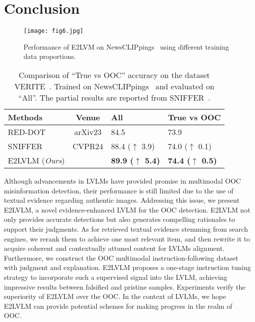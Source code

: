 \section{Conclusion}
\label{sec:Conclusion}

\begin{figure}[t]
  \centering
   \texttt{[image: fig6.jpg]}
   \caption{Performance of E2LVM on NewsCLIPpings~\cite{luo2021newsclippings} using different training data proportions.}
   \label{fig:6}
\end{figure}

\begin{table}[t]
\caption{Comparison of ``True vs OOC'' accuracy on the dataset VERITE~\cite{papadopoulos2024verite}. Trained on NewsCLIPpings~\cite{luo2021newsclippings} and evaluated on ``All''. The partial results are reported from SNIFFER~\cite{qi2024sniffer}.}
\centering
    \begin{adjustbox}{valign=c,max width=\columnwidth}
        \begin{tabular}{l|c|ll}
            \toprule
            Methods & Venue & \textbf{All} & \textbf{True vs OOC} \\
            \hline
            RED-DOT~\cite{papadopoulos2023red} & arXiv23 & 84.5 & 73.9 \\
            SNIFFER~\cite{qi2024sniffer} & CVPR24 & 88.4 ($\uparrow$ 3.9) & 74.0 ($\uparrow$ 0.1)  \\
            \rowcolor{lightgreen} E2LVLM (\textit{Ours}) &  & \textbf{89.9 ($\uparrow$ 5.4)} & \textbf{74.4 ($\uparrow$ 0.5)}  \\
            \bottomrule
        \end{tabular}
    \end{adjustbox}
\label{tab:tab_6}
\end{table}


Although advancements in LVLMs have provided promise in multimodal OOC misinformation detection, their performance is still limited due to the use of textual evidence regarding authentic images. Addressing this issue, we present E2LVLM, a novel evidence-enhanced LVLM for the OOC detection. E2LVLM not only provides accurate detections but also generates compelling rationales to support their judgments. As for retrieved textual evidence stemming from search engines, we rerank them to achieve one most relevant item, and then rewrite it to acquire coherent and contextually attuned content for LVLMs alignment. Furthermore, we construct the OOC multimodal instruction-following dataset with judgment and explanation. E2LVLM proposes a one-stage instruction tuning strategy to incorporate such a supervised signal into the LVLM, achieving impressive results between falsified and pristine samples. Experiments verify the superiority of E2LVLM over the OOC. In the context of LVLMs, we hope E2LVLM can provide potential schemes for making progress in the realm of OOC.
\clearpage